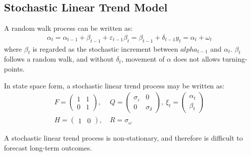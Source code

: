 \documentclass[10pt, titlepage]{article}
\numberwithin{equation}{section}
\begin{document}
\subsection{Stochastic Linear Trend Model}
A random walk process can be written as:
\begin{align*}
    \alpha_t = \alpha_{t-1} + \beta_{t-1} + \varepsilon_{t-1}
    \beta_t = \beta_{t-1} + \delta_{t-1}
    y_t = \alpha_t + \omega_t
\end{align*}
where $\beta_t$ is regarded as the stochastic increment between $alpha_{t-1}$ and $\alpha_t$. $\beta_t$ follows a random walk, and without $\delta_{t}$, movement of $\alpha$ does not allows turning-points. 

In state space form, a stochastic linear trend process may be written as:
\begin{align*}
    F = \begin{pmatrix}
        1 & 1 \\
        0 & 1
    \end{pmatrix}, &
    \ Q = \begin{pmatrix}
        \sigma_{\varepsilon} & 0\\
        0 & \sigma_{\delta}
    \end{pmatrix}, \ 
    \xi_t=\begin{pmatrix}
        \alpha_t \\
        \beta_t
    \end{pmatrix} \\
    H=\begin{pmatrix}
        1 & 0
    \end{pmatrix}, & \ R=\sigma_{\omega}
\end{align*}

A stochastic linear trend process is non-stationary, and therefore is difficult to forecast long-term outcomes. 
\end{document}
